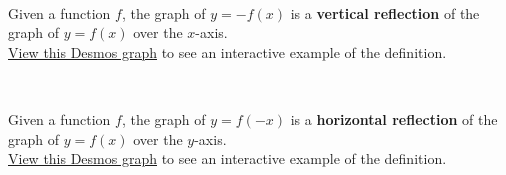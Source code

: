 \newpage

\begin{myDefinition}~\\[0.5mm]
\begin{minipage}{0.9\linewidth}
Given a function $f$, the graph of $y = -f(x)$ is a {\bf vertical reflection} of the graph of $y=f(x)$ over the $x$-axis.\\[0.4em]
 \href{https://tiny.cc/111Z-VertReflect}{View this Desmos graph} to see an interactive example of the definition.  %
\end{minipage}
\begin{minipage}{0.1\linewidth}
\flushright {}
\end{minipage}
\end{myDefinition}


\begin{myDefinition}~\\[0.5mm]
\begin{minipage}{0.9\linewidth}
Given a function $f$, the graph of $y = f(-x)$ is a {\bf horizontal reflection} of the graph of $y=f(x)$ over the $y$-axis.\\[0.4em]
 \href{https://tiny.cc/111Z-HorizReflect}{View this Desmos graph} to see an interactive example of the definition.  %
\end{minipage}
\begin{minipage}{0.1\linewidth}
\flushright {}
\end{minipage}
\end{myDefinition}


